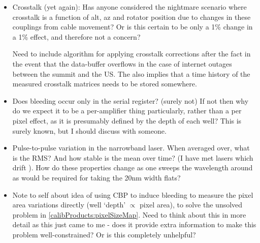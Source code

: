 \begin{itemize}
	\item Crosstalk (yet again): Has anyone considered the nightmare scenario where crosstalk is a function of alt, az and rotator position due to changes in these couplings from cable movement? Or is this certain to be only a 1\% change in a 1\% effect, and therefore not a concern? 
	
	\begin{note}
		Need to include algorithm for applying crosstalk corrections after the fact in the event that the data-buffer overflows in the case of internet outages between the summit and the US. The also implies that a time history of the measured crosstalk matrices needs to be stored somewhere.
	\end{note}
		
	\item Does bleeding occur only in the serial register? (surely not) If not then why do we expect it to be a per-amplifier thing particularly, rather than a per pixel effect, as it is presumably defined by the depth of each well? This is surely known, but I should discuss with someone. 
	
	\item Pulse-to-pulse variation in the narrowband laser. When averaged over, what is the RMS? And how stable is the mean over time? (I have met lasers which drift ). How do these properties change as one sweeps the wavelength around as would be required for taking the 20nm width flats?
	
	\item Note to self about idea of using CBP to induce bleeding to measure the pixel area variations directly (well `depth' $\propto$ pixel area), to solve the unsolved problem in \secsymbol\ref{calibProducts:pixelSizeMap}. Need to think about this in more detail as this just came to me - does it provide extra information to make this problem well-constrained? Or is this completely unhelpful?
\end{itemize}




\clearpage































